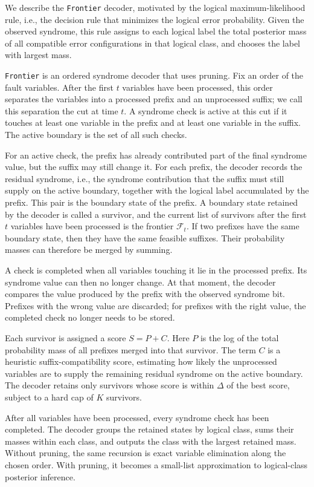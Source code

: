 \documentclass[a4paper,twocolumn,11pt,unpublished]{quantumarticle}
\newcommand{\frontier}{\texttt{Frontier}}
\begin{document}
We describe the \frontier{} decoder, motivated by the logical maximum-likelihood rule, i.e., the decision rule that minimizes the logical error probability. Given the observed syndrome, this rule assigns to each logical label the total posterior mass of all compatible error configurations in that logical class, and chooses the label with largest mass.

\frontier{} is an ordered syndrome decoder that uses pruning. Fix an order of the fault variables. After the first \(t\) variables have been processed, this order separates the variables into a processed prefix and an unprocessed suffix; we call this separation the cut at time \(t\). A syndrome check is active at this cut if it touches at least one variable in the prefix and at least one variable in the suffix. The active boundary is the set of all such checks.

For an active check, the prefix has already contributed part of the final syndrome value, but the suffix may still change it. For each prefix, the decoder records the residual syndrome, i.e., the syndrome contribution that the suffix must still supply on the active boundary, together with the logical label accumulated by the prefix. This pair is the boundary state of the prefix. A boundary state retained by the decoder is called a survivor, and the current list of survivors after the first $t$ variables have been processed is the frontier \(\mathcal{F}_t\). If two prefixes have the same boundary state, then they have the same feasible suffixes. Their probability masses can therefore be merged by summing.

A check is completed when all variables touching it lie in the processed prefix. Its syndrome value can then no longer change. At that moment, the decoder compares the value produced by the prefix with the observed syndrome bit. Prefixes with the wrong value are discarded; for prefixes with the right value, the completed check no longer needs to be stored.

Each survivor is assigned a score \(S=P+ C\). Here \(P\) is the log of the total probability mass of all prefixes merged into that survivor. The term \(C\) is a heuristic suffix-compatibility score, estimating how likely the unprocessed variables are to supply the remaining residual syndrome on the active boundary. The decoder retains only survivors whose score is within \(\Delta\) of the best score, subject to a hard cap of \(K\) survivors.

After all variables have been processed, every syndrome check has been completed. The decoder groups the retained states by logical class, sums their masses within each class, and outputs the class with the largest retained mass. Without pruning, the same recursion is exact variable elimination along the chosen order. With pruning, it becomes a small-list approximation to logical-class posterior inference.
\end{document}
